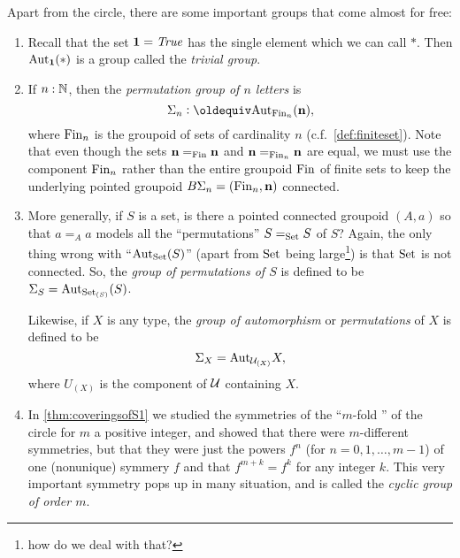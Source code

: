 \begin{example}\label{ex:groups}
  Apart from the circle, there are some important groups that come almost for free:
  \begin{enumerate}
  \item Recall that the set $\mathbf{1} =\mathop{\mathit{True}}$ has the single element which we can call $*$. Then $\mathrm{Aut}_{\mathbf{1} }(*)$ is a group called the \emph{trivial group}.
  \item If $n:\mathbb{N}$, then the \emph{permutation group of $n$ letters} is 
$$\Sigma_n\defequi\aut_{\fin_n}(\bn{n} ),$$ 
where $\operatorname{Fin}_n$ is the groupoid of sets of cardinality $n$ (c.f.~\ref{def:finiteset}).  Note that even though the sets $\mathbf{n} =_{\operatorname{Fin}}\mathbf{n} $ and $\mathbf{n} =_{\operatorname{Fin}_n}\mathbf{n} $ are equal, we must use the component $\operatorname{Fin}_n$ rather than the entire groupoid $\operatorname{Fin}$ of finite sets to keep the underlying pointed groupoid $B\Sigma_n=(\operatorname{Fin}_n,\mathbf{n} )$ connected.
  \item More generally, if $S$ is a set, is there a pointed connected groupoid $(A,a)$ so that $a=_Aa$ models all the ``permutations'' $S=_{\mathord{\mathrm{Set}}}S$ of $S$?  Again, the only thing wrong with ``$\mathrm{Aut}_{\mathord{\mathrm{Set}}}(S)$'' (apart from $\mathord{\mathrm{Set}}$ being large\footnote{how do we deal with that?}) is that $\mathord{\mathrm{Set}}$ is not connected. 
%
 So, 
the \emph{group of permutations of $S$} is defined to be $\Sigma_{S}=\mathrm{Aut}_{\mathord{\mathrm{Set}}_{(S)}}(S)$.  

Likewise, if $X$ is any type, the \emph{group of automorphism} or \emph{permutations} of $X$ is defined to be 
$$\Sigma_X=\mathrm{Aut}_{\mathcal{U}_{(X)}}X,$$
 where $U_{(X)}$ is the component of $\mathcal{U}$ containing $X$.
\item In \cref{thm:coveringsofS1} we studied the symmetries of the ``$m$-fold \covering'' of the circle for $m$ a positive integer, and showed that there were $m$-different symmetries, but that they were just the powers $f^n$ (for $n=0,1,\dots,m-1$) of one (nonunique) symmery $f$ and that $f^{m+k}=f^k$ for any integer $k$.  This very important symmetry pops up in many situation, and is called the \emph{cyclic group of order $m$}.


\end{enumerate}
\end{example}
